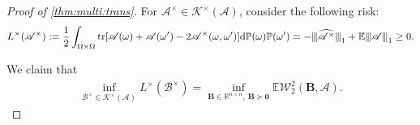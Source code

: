 \documentclass[noinfoline]{imsart}\setcounter{tocdepth}{2}
\renewcommand{\b}[1]{\mathbb{#1}} %
\newcommand{\m}[1]{\mathbf{#1}} %
\newcommand{\s}[1]{\mathscr{#1}} %
\renewcommand{\c}[1]{\mathcal{#1}} %
\newcommand{\rd}{\mathrm{d}} %
\DeclareMathOperator*{\tr}{tr}
\newcommand{\vertii}[1]{{\vert\kern-0.25ex\vert\kern-0.25ex\vert #1 
    \vert\kern-0.25ex\vert\kern-0.25ex\vert}} %
\theoremstyle{plain}
\begin{document}
\begin{proof}[Proof of \cref{thm:multi:trans}]
For $\s{A}^{\times} \in \c{K}^{\times}(\s{A})$, consider the following risk:
\begin{align*}
    L^{\times}(\s{A}^{\times}) := \frac{1}{2} \int_{\Omega \times \Omega} \tr [\s{A}(\omega) + \s{A}(\omega') - 2\s{A}^{\times}(\omega, \omega')] \rd \b{P}(\omega) \b{P}(\omega') = - \vertii{\widehat{\s{A}^{\times}}}_{1} + \b{E} \vertii{\s{A}}_{1}  \ge 0.
\end{align*}

We claim that
\begin{align*}
    \inf_{\s{B}^{\times} \in \c{K}^{\times}(\s{A})} L^{\times}(\s{B}^{\times}) = \inf_{\m{B} \in \b{R}^{n \times n}, \ \m{B} \succeq \m{0}}  \b{E} \c{W}_{2}^{2}(\m{B}, \s{A}).
\end{align*}


\end{proof}
\end{document}
